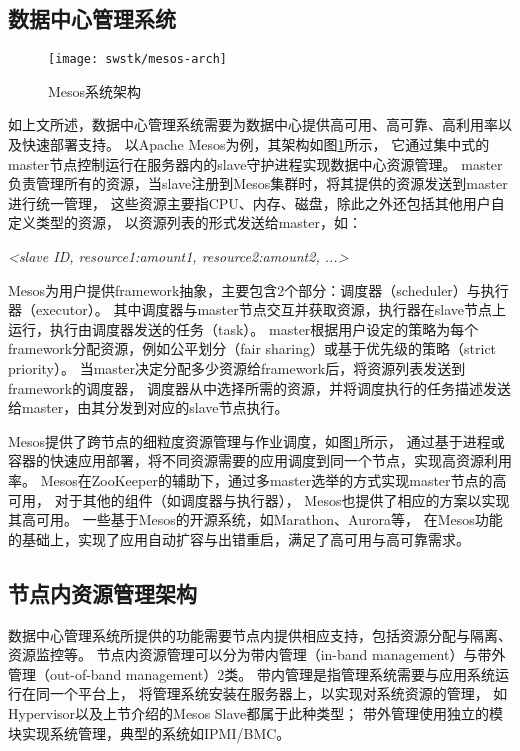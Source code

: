 \subsection{数据中心管理系统}

\begin{figure}[tb]
  \centering
  \texttt{[image: swstk/mesos-arch]}
  \caption{Mesos系统架构}
  \label{fig:mesos-arch}
\end{figure}

如上文所述，数据中心管理系统需要为数据中心提供高可用、高可靠、高利用率以及快速部署支持。
以Apache Mesos\cite{Hindman:2011:Mesos}为例，其架构如图\ref{fig:mesos-arch}所示，
它通过集中式的master节点控制运行在服务器内的slave守护进程实现数据中心资源管理。
master负责管理所有的资源，当slave注册到Mesos集群时，将其提供的资源发送到master进行统一管理，
这些资源主要指CPU、内存、磁盘，除此之外还包括其他用户自定义类型的资源，
以资源列表的形式发送给master，如：

\textit{<slave ID, resource1:amount1, resource2:amount2, ...>}

Mesos为用户提供framework抽象，主要包含2个部分：调度器（scheduler）与执行器（executor）。
其中调度器与master节点交互并获取资源，执行器在slave节点上运行，执行由调度器发送的任务（task）。
master根据用户设定的策略为每个framework分配资源，例如公平划分（fair sharing）或基于优先级的策略（strict priority）。
当master决定分配多少资源给framework后，将资源列表发送到framework的调度器，
调度器从中选择所需的资源，并将调度执行的任务描述发送给master，由其分发到对应的slave节点执行。

Mesos提供了跨节点的细粒度资源管理与作业调度，如图\ref{fig:mesos-arch}所示，
通过基于进程或容器的快速应用部署，将不同资源需要的应用调度到同一个节点，实现高资源利用率。
Mesos在ZooKeeper的辅助下，通过多master选举的方式实现master节点的高可用，
对于其他的组件（如调度器与执行器），
Mesos也提供了相应的方案以实现其高可用\cite{mesos-high-available-framework}。
一些基于Mesos的开源系统，如Marathon\cite{marathon}、Aurora\cite{Aurora}等，
在Mesos功能的基础上，实现了应用自动扩容与出错重启，满足了高可用与高可靠需求。


\subsection{节点内资源管理架构}

数据中心管理系统所提供的功能需要节点内提供相应支持，包括资源分配与隔离、资源监控等。
节点内资源管理可以分为带内管理（in-band management）与带外管理（out-of-band management）2类。
带内管理是指管理系统需要与应用系统运行在同一个平台上，
将管理系统安装在服务器上，以实现对系统资源的管理，
如Hypervisor以及上节介绍的Mesos Slave都属于此种类型；
带外管理使用独立的模块实现系统管理，典型的系统如IPMI/BMC。


